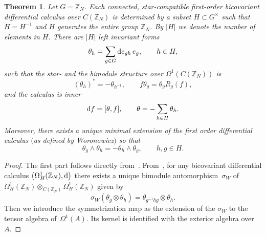 \documentclass[10pt,a4paper]{amsart}
\numberwithin{equation}{section}
\newtheorem{Theorem}{Theorem}[section]
\newcommand{\Z}{\mathbb{Z}}
\begin{document}
\begin{Theorem}
Let $G=\Z_N$. Each connected, star-compatible first-order
bicovariant differential calculus over $C(\Z_N)$ is determined by a subset
$H \subset G^\times$ such that $H = H^{-1}$ and $H$ generates the entire group $\Z_N$. By $|H|$ we denote the number of elements in $H$. There are $|H|$ left invariant forms
\[ \theta_h=\sum\limits_{g\in G}{\rm d}e_{gh}\, e_g, \qquad h \in H, \]
such that the star- and the bimodule structure over $\Omega^1(C(\Z_N))$ is
\[ (\theta_h)^* = - \theta_{h^{-1}}, \qquad f \theta_g = \theta_g R_g(f), \]
and the calculus is inner
\[ {\rm d} f = [\theta, f], \qquad \theta = -\sum\limits_{h \in H} \theta_h. \]
Moreover, there exists a unique minimal extension of the first order differential calculus
$($as defined by Woronowicz$)$ so that
\[ \theta_g \wedge \theta_h = - \theta_h \wedge \theta_g, \qquad h,g \in H. \]
\end{Theorem}
\begin{proof}
The first part follows directly from~\cite[Section~2]{DMH}. From~\cite[Proposition 3.1]{Wo89}, for any bicovariant differential calculus $\big(\Omega^1_H(\mathbb{Z}_N),{\rm d}\big)$ there exists a unique bimodule automorphism~$\sigma_W$ of $\Omega^1_H(\mathbb{Z}_N)\otimes_{C(\mathbb{Z}_N)} \Omega^1_H(\mathbb{Z}_N)$ given by
\[ \sigma_W(\theta_g\otimes\theta_h)=\theta_{g^{-1}hg}\otimes\theta_h.\]
Then we introduce the symmetrization map as the extension of the $\sigma_W$ to the tensor algebra of~$\Omega^1(A)$. Its
kernel is identified with the exterior algebra over~$A$.
\end{proof}
\end{document}
